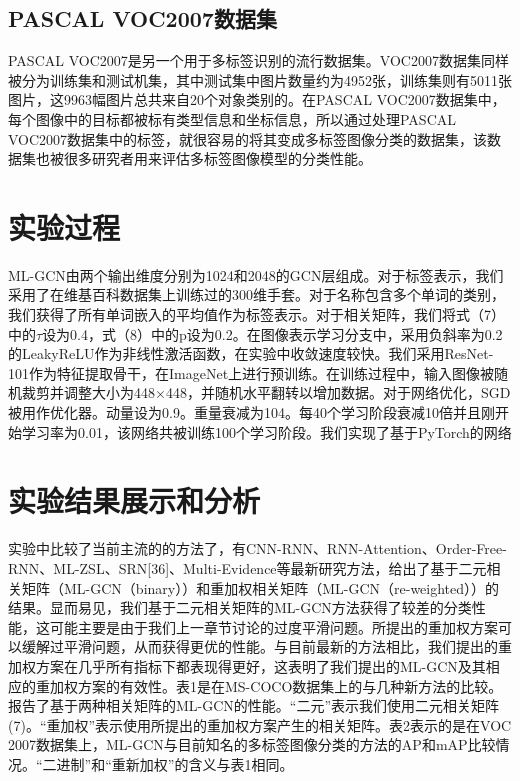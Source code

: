 \subsection{PASCAL VOC2007数据集}
PASCAL VOC2007是另一个用于多标签识别的流行数据集。VOC2007数据集同样被分为训练集和测试机集，其中测试集中图片数量约为4952张，训练集则有5011张图片，这9963幅图片总共来自20个对象类别的。在PASCAL VOC2007数据集中，每个图像中的目标都被标有类型信息和坐标信息，所以通过处理PASCAL VOC2007数据集中的标签，就很容易的将其变成多标签图像分类的数据集，该数据集也被很多研究者用来评估多标签图像模型的分类性能。

\section{实验过程}

ML-GCN由两个输出维度分别为1024和2048的GCN层组成。对于标签表示，我们采用了在维基百科数据集上训练过的300维手套\cite{Xue2011Correlative}。对于名称包含多个单词的类别，我们获得了所有单词嵌入的平均值作为标签表示。对于相关矩阵，我们将式（7）中的$\tau$设为0.4，式（8）中的p设为0.2。在图像表示学习分支中，采用负斜率为0.2的LeakyReLU作为非线性激活函数，在实验中收敛速度较快。我们采用ResNet-101\cite{Read2008Multi}作为特征提取骨干，在ImageNet\cite{Tsoumakas2007Random}上进行预训练。在训练过程中，输入图像被随机裁剪并调整大小为448×448，并随机水平翻转以增加数据。对于网络优化，SGD被用作优化器。动量设为0.9。重量衰减为104。每40个学习阶段衰减10倍并且刚开始学习率为0.01，该网络共被训练100个学习阶段。我们实现了基于PyTorch的网络

\section{实验结果展示和分析}
实验中比较了当前主流的的方法了，有CNN-RNN\cite{Jiang2016CNN}、RNN-Attention、Order-Free-RNN\cite{Chen2017Order}、ML-ZSL\cite{Li2015Leveraging}、SRN[36]、Multi-Evidence\cite{Clare2002Knowledge}等最新研究方法，给出了基于二元相关矩阵（ML-GCN（binary））和重加权相关矩阵（ML-GCN（re-weighted））的结果。显而易见，我们基于二元相关矩阵的ML-GCN方法获得了较差的分类性能，这可能主要是由于我们上一章节讨论的过度平滑问题。所提出的重加权方案可以缓解过平滑问题，从而获得更优的性能。与目前最新的方法相比，我们提出的重加权方案在几乎所有指标下都表现得更好，这表明了我们提出的ML-GCN及其相应的重加权方案的有效性。表1是在MS-COCO数据集上的与几种新方法的比较。报告了基于两种相关矩阵的ML-GCN的性能。“二元”表示我们使用二元相关矩阵(7)。“重加权”表示使用所提出的重加权方案产生的相关矩阵。表2表示的是在VOC 2007数据集上，ML-GCN与目前知名的多标签图像分类的方法的AP和mAP比较情况。“二进制”和“重新加权”的含义与表1相同。

